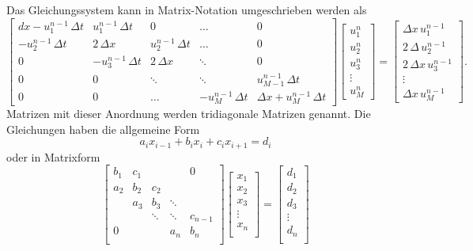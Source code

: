 	Das Gleichungssystem kann in Matrix-Notation umgeschrieben werden als
	\begin{equation}
	\left[{\begin{matrix}
	{dx- u_{1}^{n-1}\, \Delta t}&{ u_{1}^{n-1} \, \Delta t}&{0}&{\dots}&{0}\\[5pt]
	{-u_{2}^{n-1} \, \Delta t}&{ 2 \, \Delta x}&{ u_{2}^{n-1} \, \Delta t}&{\dots}&{0}\\[5pt]
	{0}&{-u_{3}^{n-1} \, \Delta t}&{ 2 \, \Delta x}&\ddots &{0}\\[5pt]
	{0}&{0}&\ddots &\ddots &{ u_{M-1}^{n-1} \, \Delta t}\\[5pt]
	{0}&{0}&{\dots}&{-u_{M}^{n-1} \, \Delta t}&{\Delta x + u_{M}^{n-1}\, \Delta t}
	\end{matrix}}
	\right]\left[{\begin{matrix}
	{ u_{1}^{n}}\\[5pt]
	{ u_{2}^{n}}\\[5pt]
	{ u_{3}^{n}}\\[5pt]
	\vdots \\[5pt]
	{ u_{M}^{n}}
	\end{matrix}}\right]
	=\left[{\begin{matrix}
	{\Delta x \, u_{1}^{n-1}}\\[5pt]
	{ 2 \, \Delta  \, u_{2}^{n-1}}\\[5pt]
	{ 2 \, \Delta x \, u_{3}^{n-1}}\\[5pt]
	\vdots \\[5pt]
	{\Delta x \, u_{M}^{n-1}}
	\end{matrix}}\right].
	  \end{equation}
	Matrizen mit dieser Anordnung werden tridiagonale Matrizen genannt.
%
	Die Gleichungen haben die allgemeine Form
	  \begin{equation}
	    a_{i}x_{{i-1}}+b_{i}x_{i}+c_{i}x_{{i+1}}=d_{i}
	  \end{equation}
	oder in Matrixform
	  \begin{equation}
	    \begin{bmatrix}{b_{1}}&{c_{1}}&{}&{}&{0}\\
	      {a_{2}}&{b_{2}}&{c_{2}}&{}&{}\\
	      {}&{a_{3}}&{b_{3}}&\ddots &{}\\
	      {}&{}&\ddots &\ddots &{c_{n-1}}\\
	      {0}&{}&{}&{a_{n}}&{b_{n}}\\
	      \end{bmatrix}
	      \begin{bmatrix}{x_{1}}\\
	      {x_{2}}\\{x_{3}}\\\vdots \\
	      {x_{n}}\\
	      \end{bmatrix}
	      =
	      \begin{bmatrix}{d_{1}}\\
	      {d_{2}}\\{d_{3}}\\
	      \vdots \\{d_{n}}\\
	    \end{bmatrix}
	  \end{equation}
